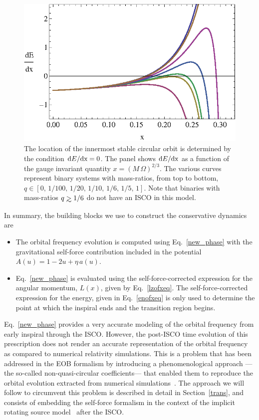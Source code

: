 \documentclass[aps,prd,showpacs,amssymb,floatfix,nofootinbib,superscriptaddress]{revtex4-1}%
\def\gtrsim{\mathrel{\hbox{\rlap{\hbox{\lower4pt\hbox{$\sim$}}}\hbox{$>$}}}}
\begin{document}
 
\begin{figure}[ht]
\centerline{
\includegraphics[height=0.33\textwidth,  clip]{dedx_for_isco.eps}
}
\caption{The location of the innermost stable circular orbit is determined by the condition \({\rm{d}}E/\rm{d}x = 0\). The panel shows \({\rm{d}}E/\rm{d}x\) as a function of the gauge invariant quantity \(x=\left(M\,\Omega\right)^{2/3}\). The various curves represent binary systems with mass-ratios, from top to bottom, \(q \in [0,\, 1/100, \,1/20, \,1/10, \,1/6, \,1/5, \,1 ]\). Note that binaries with mass-ratios \(q\gtrsim 1/6\) do not have an ISCO in this model. }
\label{dedx}
\end{figure}

In summary, the building blocks we use to construct the conservative dynamics are

\begin{itemize}
\item The orbital frequency evolution is computed using Eq.~\eqref{new_phase} with the gravitational self-force contribution included in the potential \(A(u)= 1-2u + \eta\, a(u)\).
\item Eq.~\eqref{new_phase} is evaluated using the self-force-corrected expression for the angular momentum, \(L(x)\), given by Eq.~\eqref{lzofxeq}. The self-force-corrected expression for the energy, given in Eq.~\eqref{enofxeq} is only used to determine the point at which the inspiral ends and the transition region begins.
\end{itemize}

Eq.~\eqref{new_phase} provides a very accurate modeling of the orbital frequency from early inspiral through the ISCO. However, the post-ISCO time evolution of this prescription does not render an accurate representation of the orbital frequency as compared to numerical relativity simulations. This is a problem that has been addressed in the EOB formalism by introducing a phenomenological approach ---the so-called non-quasi-circular coefficients--- that enabled them to reproduce the orbital evolution extracted from numerical simulations~\cite{buho}. The approach we will follow to circumvent this problem is described in detail in Section~\ref{trans}, and consists of embedding the self-force formalism in the context of the implicit rotating source model~\cite{Baker:2008} after the ISCO.
\end{document}

